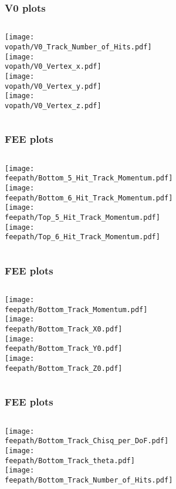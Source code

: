 \documentclass{beamer}
\newcommand{\feepath}{/Users/pbutti/sw/hps-java-validation/analysis/fee_2016_validation}
\newcommand{\vopath}{/Users/pbutti/sw/hps-java-validation/analysis/v0_2016_validation}
\begin{document}
\begin{frame}
\frametitle{V0 plots}
\begin{columns}[c]
\texttt{[image: \\vopath/V0\_Track\_Number\_of\_Hits.pdf]}\\
\texttt{[image: \\vopath/V0\_Vertex\_x.pdf]}\\
\texttt{[image: \\vopath/V0\_Vertex\_y.pdf]}\\
\texttt{[image: \\vopath/V0\_Vertex\_z.pdf]}\\
\end{columns}
\end{frame}


\begin{frame}
\frametitle{FEE plots}
\begin{columns}[c]
\texttt{[image: \\feepath/Bottom\_5\_Hit\_Track\_Momentum.pdf]}\\
\texttt{[image: \\feepath/Bottom\_6\_Hit\_Track\_Momentum.pdf]}\\
\texttt{[image: \\feepath/Top\_5\_Hit\_Track\_Momentum.pdf]}\\
\texttt{[image: \\feepath/Top\_6\_Hit\_Track\_Momentum.pdf]}\\
\end{columns}
\end{frame}


\begin{frame}
\frametitle{FEE plots}
\begin{columns}[c]
\texttt{[image: \\feepath/Bottom\_Track\_Momentum.pdf]}\\
\texttt{[image: \\feepath/Bottom\_Track\_X0.pdf]}\\
\texttt{[image: \\feepath/Bottom\_Track\_Y0.pdf]}\\
\texttt{[image: \\feepath/Bottom\_Track\_Z0.pdf]}\\
\end{columns}
\end{frame}


\begin{frame}
\frametitle{FEE plots}
\begin{columns}[c]
\texttt{[image: \\feepath/Bottom\_Track\_Chisq\_per\_DoF.pdf]}\\
\texttt{[image: \\feepath/Bottom\_Track\_theta.pdf]}\\
\texttt{[image: \\feepath/Bottom\_Track\_Number\_of\_Hits.pdf]}\\
\end{columns}
\end{frame}
\end{document}
